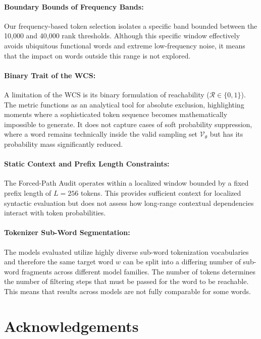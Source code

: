 \documentclass{article}
\begin{document}
\paragraph{Boundary Bounds of Frequency Bands:}
Our frequency-based token selection isolates a specific band bounded between the 10,000 and 40,000 rank thresholds. Although this specific window effectively avoids ubiquitous functional words and extreme low-frequency noise, it means that the impact on words outside this range is not explored.

\paragraph{Binary Trait of the WCS:}
A limitation of the WCS is its binary formulation of reachability ($\mathcal{R} \in \{0,1\}$). The metric functions as an analytical tool for absolute exclusion, highlighting moments where a sophisticated token sequence becomes mathematically impossible to generate. It does not capture cases of soft probability suppression, where a word remains technically inside the valid sampling set $\mathcal{V}_\theta$ but has its probability mass significantly reduced.

\paragraph{Static Context and Prefix Length Constraints:}
The Forced-Path Audit operates within a localized window bounded by a fixed prefix length of $L=256$ tokens. This provides sufficient context for localized syntactic evaluation but does not assess how long-range contextual dependencies interact with token probabilities.

\paragraph{Tokenizer Sub-Word Segmentation:}
The models evaluated utilize highly diverse sub-word tokenization vocabularies and therefore the same target word $w$ can be split into a differing number of sub-word fragments across different model families. The number of tokens determines the number of filtering steps that must be passed for the word to be reachable. This means that results across models are not fully comparable for some words.



\section{Acknowledgements}
\end{document}
